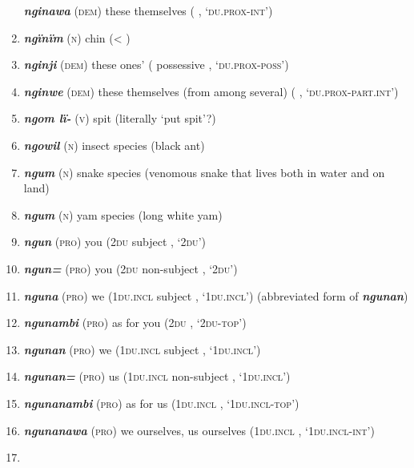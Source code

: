 \begin{enumerate}[noitemsep, label={}, align=left, widest=190, labelsep=1ex,leftmargin=*,itemindent=-10pt]
\textbf{\textit{nginawa}} (\textsc{dem}) these themselves (   , \linebreak‘\textsc{du.prox-int}’) \item 
\textbf{\textit{ngïnïm}} (\textsc{n}) chin (< ) \item 
\textbf{\textit{nginji}} (\textsc{dem}) these ones’ (  possessive , \linebreak‘\textsc{du.prox-poss}’) \item 
\textbf{\textit{nginwe}} (\textsc{dem}) these themselves (from among several) (  \linebreak {} , ‘\textsc{du.prox-part.int}’) \item 
\textbf{\textit{ngom lï-}} (\textsc{v}) spit (literally ‘put spit’?) \item 
\textbf{\textit{ngowil}} (\textsc{n}) insect species (black ant) \item 
\textbf{\textit{ngum}} (\textsc{n}) snake species (venomous snake that lives both in water and on land) \item 
\textbf{\textit{ngum}} (\textsc{n}) yam species (long white yam) \item 
\textbf{\textit{ngun}} (\textsc{pro}) you (\textsc{2du} subject , ‘\textsc{2du}’) \item 
\textbf{\textit{ngun=}} (\textsc{pro}) you (\textsc{2du} non-subject , ‘\textsc{2du}’) \item 
\textbf{\textit{nguna}} (\textsc{pro}) we (\textsc{1du.incl} subject , ‘\textsc{1du.incl}’) (abbreviated form of \textbf{\textit{ngunan}}) \item 
\textbf{\textit{ngunambi}} (\textsc{pro}) as for you (\textsc{2du} , ‘\textsc{2du-top}’) \item 
\textbf{\textit{ngunan}} (\textsc{pro}) we (\textsc{1du.incl} subject , ‘\textsc{1du.incl}’) \item 
\textbf{\textit{ngunan=}} (\textsc{pro}) us (\textsc{1du.incl} non-subject , ‘\textsc{1du.incl}’) \item 
\textbf{\textit{ngunanambi}} (\textsc{pro}) as for us (\textsc{1du.incl} , ‘\textsc{1du.incl-top}’) \item 
\textbf{\textit{ngunanawa}} (\textsc{pro}) we ourselves, us ourselves (\textsc{1du.incl} , \linebreak‘\textsc{1du.incl-int}’) \item 

\end{enumerate}

